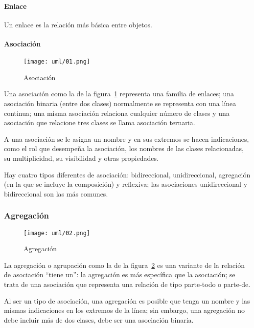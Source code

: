 \paragraph*{Enlace}
Un enlace es la relación más básica entre objetos.

\paragraph*{Asociación}



\begin{figure}[H] 
    \centering
    \texttt{[image: uml/01.png]}
    \caption{Asociación}
    \label{img:uml-asociacion}
\end{figure}

Una asociación como la de la figura~\ref{img:uml-asociacion} representa una familia de enlaces; una asociación binaria (entre dos clases) normalmente se representa con una línea continua; una misma asociación relaciona cualquier número de clases y una asociación que relacione tres clases se llama asociación ternaria.

A una asociación se le asigna un nombre y en sus extremos se hacen indicaciones, como el rol que desempeña la asociación, los nombres de las clases relacionadas, su multiplicidad, su visibilidad y otras propiedades.

Hay cuatro tipos diferentes de asociación: bidireccional, unidireccional, agregación (en la que se incluye la composición) y reflexiva; las asociaciones unidireccional y bidireccional son las más comunes.


\subsubsection*{Agregación}


\begin{figure}[H] 
    \centering
    \texttt{[image: uml/02.png]}
    \caption{Agregación}
    \label{img:uml-agregacion}
\end{figure}


La agregación o agrupación como la de la figura~\ref{img:uml-agregacion} es una variante de la relación de asociación ``tiene un'': la agregación es más específica que la asociación; se trata de una asociación que representa una relación de tipo parte-todo o parte-de.


Al ser un tipo de asociación, una agregación es posible que tenga un nombre y las mismas indicaciones en los extremos de la línea; sin embargo, una agregación no debe incluir más de dos clases, debe ser una asociación binaria.


